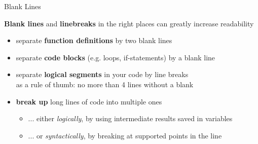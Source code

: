 \begin{frame}{Blank Lines}

    \textbf{Blank lines} and \textbf{linebreaks} in the right places can greatly increase readability

    \vspace{1em}

    \begin{itemize}
        \item separate \textbf{function definitions} by two blank lines
        \item separate \textbf{code blocks} (e.g. loops, if-statements) by a blank line
        \item separate \textbf{logical segments} in your code by line breaks \\
            as a rule of thumb: no more than 4 lines without a blank
        \item \textbf{break up} long lines of code into multiple ones
        \begin{itemize}
            \item ... either \textit{logically}, by using intermediate results saved in variables
            \item ... or \textit{syntactically}, by breaking at supported points in the line
        \end{itemize}
    \end{itemize}


\end{frame}


